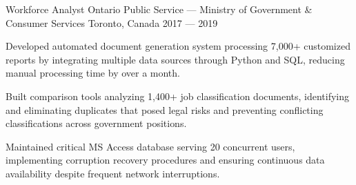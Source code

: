 \begin{cventries}
\cventry%
	{Workforce Analyst}
	{Ontario Public Service --- Ministry of Government \& Consumer Services}
	{Toronto, Canada}
	{2017 --- 2019}
	{
		\begin{cvitems}
			\item Developed automated document generation system processing 7,000+ customized reports by integrating multiple data sources through Python and SQL, reducing manual processing time by over a month.
			\item Built comparison tools analyzing 1,400+ job classification documents, identifying and eliminating duplicates that posed legal risks and preventing conflicting classifications across government positions.
			\item Maintained critical MS Access database serving 20 concurrent users, implementing corruption recovery procedures and ensuring continuous data availability despite frequent network interruptions.
		\end{cvitems}
	}

\end{cventries}